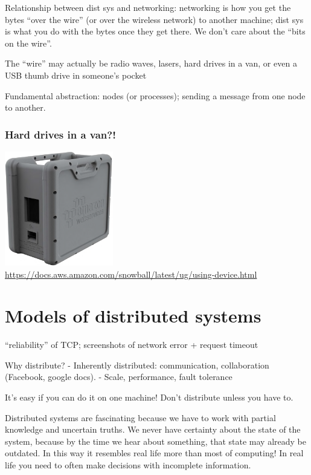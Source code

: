 Relationship between dist sys and networking: networking is how you get the bytes ``over the wire'' (or over the wireless network) to another machine; dist sys is what you do with the bytes once they get there.
We don't care about the ``bits on the wire''.

The ``wire'' may actually be radio waves, lasers, hard drives in a van, or even a USB thumb drive in someone's pocket

Fundamental abstraction: nodes (or processes); sending a message from one node to another.

\begin{frame}[plain]
    \label{s:snowball}
    \frametitle{Hard drives in a van?!}
    \begin{center}
        \includegraphics[height=5cm]{images/aws-snowball.png}\\[0.5em]
        \footnotesize{\url{https://docs.aws.amazon.com/snowball/latest/ug/using-device.html}}
    \end{center}
\end{frame}

\section{Models of distributed systems}

``reliability'' of TCP; screenshots of network error + request timeout

Why distribute?
- Inherently distributed: communication, collaboration (Facebook, google docs).
- Scale, performance, fault tolerance

It's easy if you can do it on one machine! Don't distribute unless you have to. 

Distributed systems are fascinating because we have to work with partial knowledge and uncertain
truths. We never have certainty about the state of the system, because by the time we hear about
something, that state may already be outdated. In this way it resembles real life more than most of
computing! In real life you need to often make decisions with incomplete information.

